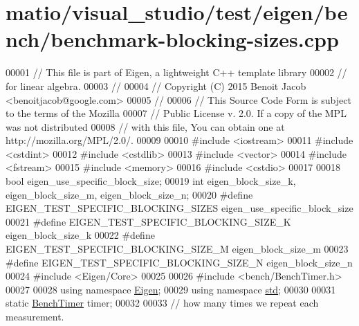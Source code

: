 \hypertarget{matio_2visual__studio_2test_2eigen_2bench_2benchmark-blocking-sizes_8cpp_source}{}\section{matio/visual\+\_\+studio/test/eigen/bench/benchmark-\/blocking-\/sizes.cpp}
\label{matio_2visual__studio_2test_2eigen_2bench_2benchmark-blocking-sizes_8cpp_source}

\begin{DoxyCode}
00001 \textcolor{comment}{// This file is part of Eigen, a lightweight C++ template library}
00002 \textcolor{comment}{// for linear algebra.}
00003 \textcolor{comment}{//}
00004 \textcolor{comment}{// Copyright (C) 2015 Benoit Jacob <benoitjacob@google.com>}
00005 \textcolor{comment}{//}
00006 \textcolor{comment}{// This Source Code Form is subject to the terms of the Mozilla}
00007 \textcolor{comment}{// Public License v. 2.0. If a copy of the MPL was not distributed}
00008 \textcolor{comment}{// with this file, You can obtain one at http://mozilla.org/MPL/2.0/.}
00009 
00010 \textcolor{preprocessor}{#include <iostream>}
00011 \textcolor{preprocessor}{#include <cstdint>}
00012 \textcolor{preprocessor}{#include <cstdlib>}
00013 \textcolor{preprocessor}{#include <vector>}
00014 \textcolor{preprocessor}{#include <fstream>}
00015 \textcolor{preprocessor}{#include <memory>}
00016 \textcolor{preprocessor}{#include <cstdio>}
00017 
00018 \textcolor{keywordtype}{bool} eigen\_use\_specific\_block\_size;
00019 \textcolor{keywordtype}{int} eigen\_block\_size\_k, eigen\_block\_size\_m, eigen\_block\_size\_n;
00020 \textcolor{preprocessor}{#define EIGEN\_TEST\_SPECIFIC\_BLOCKING\_SIZES eigen\_use\_specific\_block\_size}
00021 \textcolor{preprocessor}{#define EIGEN\_TEST\_SPECIFIC\_BLOCKING\_SIZE\_K eigen\_block\_size\_k}
00022 \textcolor{preprocessor}{#define EIGEN\_TEST\_SPECIFIC\_BLOCKING\_SIZE\_M eigen\_block\_size\_m}
00023 \textcolor{preprocessor}{#define EIGEN\_TEST\_SPECIFIC\_BLOCKING\_SIZE\_N eigen\_block\_size\_n}
00024 \textcolor{preprocessor}{#include <Eigen/Core>}
00025 
00026 \textcolor{preprocessor}{#include <bench/BenchTimer.h>}
00027 
00028 \textcolor{keyword}{using namespace }\hyperlink{namespace_eigen}{Eigen};
00029 \textcolor{keyword}{using namespace }\hyperlink{namespacestd}{std};
00030 
00031 \textcolor{keyword}{static} \hyperlink{class_eigen_1_1_bench_timer}{BenchTimer} timer;
00032 
00033 \textcolor{comment}{// how many times we repeat each measurement.}

\end{DoxyCode}
